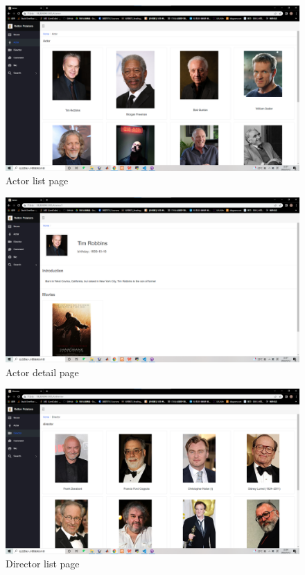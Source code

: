 \begin{CJK*}{UTF8}{gbsn}
    \begin{figure}[htbp]
    \centering
    \includegraphics[width=1\textwidth]{res_actor1.png}
    \caption{Actor list page}
    \end{figure}
    
    \begin{figure}[htbp]
    \centering
    \includegraphics[width=1\textwidth]{res_actor2.png}
    \caption{Actor detail page}
    \end{figure}
    
    \begin{figure}[htbp]
    \centering
    \includegraphics[width=1\textwidth]{res_dir1.png}
    \caption{Director list page}
    \end{figure}
    

\end{CJK*}
